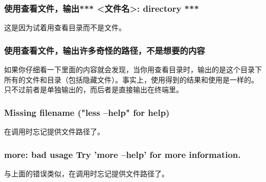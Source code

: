 \subsubsection{使用查看文件，输出*** <文件名>: directory ***}

这是因为试着用查看目录而不是文件。

\subsubsection{使用查看文件，输出许多奇怪的路径，不是想要的内容}

如果你仔细看一下里面的内容就会发现，当你用查看目录时，输出的是这个目录下所有的文件和目录（包括隐藏文件）。事实上，使用得到的结果和使用是一样的。只不过前者是单独输出的，而后者是直接输出在终端里。

\subsubsection{Missing filename ("less --help" for help)}

在调用时忘记提供文件路径了。

\subsubsection{more: bad usage Try 'more --help' for more information.}

与上面的错误类似，在调用时忘记提供文件路径了。